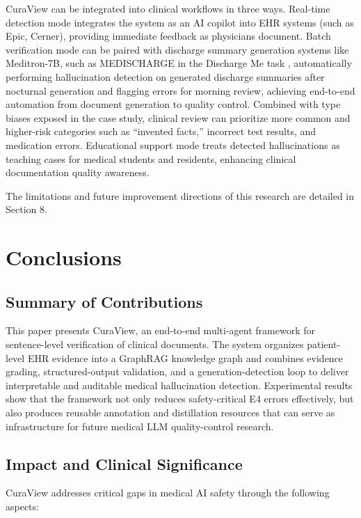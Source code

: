 \documentclass[11pt]{article}
\begin{document}
CuraView can be integrated into clinical workflows in three ways. Real-time detection mode integrates the system as an AI copilot into EHR systems (such as Epic, Cerner), providing immediate feedback as physicians document. Batch verification mode can be paired with discharge summary generation systems like Meditron-7B, such as MEDISCHARGE in the Discharge Me task \citep{wu2024epflMakeDischargeMe}, automatically performing hallucination detection on generated discharge summaries after nocturnal generation and flagging errors for morning review, achieving end-to-end automation from document generation to quality control. Combined with type biases exposed in the case study, clinical review can prioritize more common and higher-risk categories such as ``invented facts,'' incorrect test results, and medication errors. Educational support mode treats detected hallucinations as teaching cases for medical students and residents, enhancing clinical documentation quality awareness.

The limitations and future improvement directions of this research are detailed in Section 8.

\section{Conclusions}
\subsection{Summary of Contributions}

This paper presents CuraView, an end-to-end multi-agent framework for sentence-level verification of clinical documents. The system organizes patient-level EHR evidence into a GraphRAG knowledge graph and combines evidence grading, structured-output validation, and a generation-detection loop to deliver interpretable and auditable medical hallucination detection. Experimental results show that the framework not only reduces safety-critical E4 errors effectively, but also produces reusable annotation and distillation resources that can serve as infrastructure for future medical LLM quality-control research.

\subsection{Impact and Clinical Significance}

CuraView addresses critical gaps in medical AI safety through the following aspects:
\end{document}
